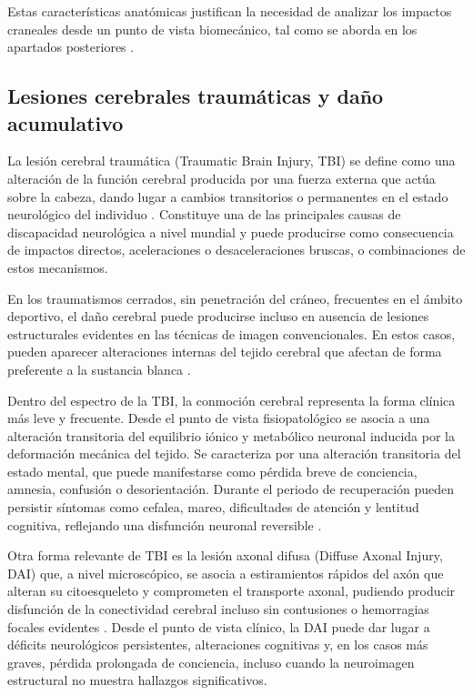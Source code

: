 Estas características anatómicas justifican la necesidad de analizar los impactos craneales desde un punto de vista biomecánico, tal como se aborda en los apartados posteriores \cite{Meaney2011Biomechanics}.

\subsection{Lesiones cerebrales traumáticas y daño acumulativo}

La lesión cerebral traumática (Traumatic Brain Injury, TBI) se define como una alteración
de la función cerebral producida por una fuerza externa que actúa sobre la cabeza, dando lugar
a cambios transitorios o permanentes en el estado neurológico del individuo \cite{parikh2007tbi}. 
Constituye una de las principales causas de discapacidad neurológica a nivel mundial y puede producirse como consecuencia de impactos directos, aceleraciones o desaceleraciones bruscas, o combinaciones de estos mecanismos.

En los traumatismos cerrados, sin penetración del cráneo, frecuentes en el ámbito deportivo, el daño cerebral puede producirse incluso en ausencia de lesiones estructurales evidentes en las técnicas de imagen convencionales. En estos casos, pueden aparecer alteraciones internas del tejido cerebral que afectan de forma preferente a la sustancia blanca \cite{parikh2007tbi}.

Dentro del espectro de la TBI, la conmoción cerebral representa la forma clínica más leve y frecuente. Desde el punto de vista fisiopatológico se asocia a una alteración transitoria del equilibrio iónico y metabólico neuronal inducida por la deformación mecánica del tejido. Se caracteriza por una alteración transitoria del estado mental, que puede manifestarse como pérdida breve de conciencia, amnesia, confusión o desorientación. Durante el periodo de recuperación pueden persistir síntomas como cefalea, mareo, dificultades de atención y lentitud cognitiva, reflejando una disfunción neuronal reversible \cite{blennow2012tbi}. 

Otra forma relevante de TBI es la lesión axonal difusa (Diffuse Axonal Injury, DAI) que, a nivel microscópico, se asocia a estiramientos rápidos del axón que alteran su citoesqueleto y comprometen el transporte axonal, pudiendo producir disfunción de la conectividad cerebral incluso sin contusiones o hemorragias focales evidentes \cite{Meaney2011Biomechanics}. Desde el punto de vista clínico, la DAI puede dar lugar a déficits neurológicos persistentes, alteraciones cognitivas y, en los casos más graves, pérdida prolongada de conciencia, incluso cuando la neuroimagen estructural no muestra hallazgos significativos.

